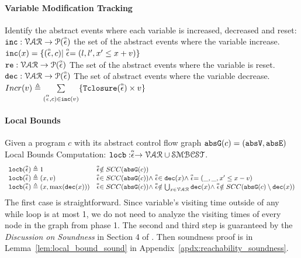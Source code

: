 \paragraph*{Variable Modification Tracking}
Identify the abstract events where each variable is increased, decreased and reset:
\\
$\inc: \mathcal{VAR} \to \mathcal{P}(\absevent) $
the set of the abstract events where the variable increase.
\\
$\inc(x) = \{(\absevent, c) | \absevent = (l, l', x' \leq x + v)\}$
\\
$\reset: \mathcal{VAR} \to \mathcal{P}(\absevent) $
The set of the abstract events where the variable is reset.
\\
$\dec: \mathcal{VAR} \to \mathcal{P}(\absevent) $
The set of abstract events where the variable decrease.
\\
$Incr(v) \triangleq \sum\limits_{(\absevent, c) \in \inc(v)}\{\absclr(\absevent) \times v\}$
%
\paragraph*{Local Bounds}
Given a program $c$ with its abstract control flow graph 
$\absG(c) = (\absV, \absE)$
\\
Local Bounds Computation:
$\locbound: \absevent \to \mathcal{VAR} \cup \constdom$.
%
\[ 
\begin{array}{ll}
  \locbound(\absevent) \triangleq 1 
  & \absevent \notin SCC(\absG(c))
  \\
  \locbound(\absevent) \triangleq (x, v) 
  & \absevent \in SCC(\absG(c)) \land \absevent \in \dec(x) \land  \absevent = (\_, \_ , x' \leq x - v) \\
  \locbound(\absevent) \triangleq (x, \max(\dec(x))) 
  & \absevent \in SCC(\absG(c)) \land 
  \absevent  \notin \bigcup_{x \in \mathcal{VAR}} \dec(x)
  \land \absevent \notin SCC(\absG(c) \setminus \dec(x)) 
\end{array}
  \]
  The first case is straightforward. Since variable's visiting time outside of any while loop is at most 1, we do not need to analyze the visiting times of every node in the graph from phase 1.
  The second and third step is guaranteed by the \emph{Discussion on Soundness} in Section 4 of \cite{sinn2017complexity}.
  Then soundness proof is in Lemma~\ref{lem:local_bound_sound} in Appendix~\ref{apdx:reachability_soundness}.
%
